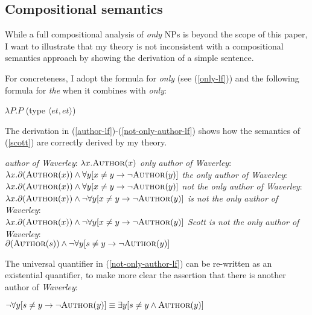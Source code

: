 \subsection{Compositional semantics}
While a full compositional analysis of \textit{only} NPs is beyond the scope of this paper, I want to illustrate that my theory is not inconsistent with a compositional semantics approach by showing the derivation of a simple sentence.

For concreteness, I adopt the  formula for \textit{only} (see (\ref{only-lf})) and the following formula for \textit{the} when it combines with \textit{only}:

\begin{exe}
	\ex $\lambda P . P$ (type $\langle et, et \rangle$)
\end{exe}

The derivation in (\ref{author-lf})-(\ref{not-only-author-lf}) shows how the semantics of (\ref{scott}) are correctly derived by my theory.

\begin{exe}
	\ex \label{author-lf} \textit{author of Waverley}: $\lambda x . \textsc{Author}(x)$
	\ex \textit{only author of Waverley}: $\lambda x . \partial(\textsc{Author}(x)) \land \forall y [ x \ne y \to \neg \textsc{Author}(y) ]$
	\ex \textit{the only author of Waverley}: $\lambda x . \partial(\textsc{Author}(x)) \land \forall y [ x \ne y \to \neg \textsc{Author}(y) ]$
	\ex \textit{not the only author of Waverley}: \\ $\lambda x . \partial(\textsc{Author}(x)) \land \neg  \forall y [ x \ne y \to \neg \textsc{Author}(y) ]$
	\ex \textit{is not the only author of Waverley}: \\ $\lambda x . \partial(\textsc{Author}(x)) \land \neg  \forall y [ x \ne y \to \neg \textsc{Author}(y) ]$
	\ex \label{not-only-author-lf} \textit{Scott is not the only author of Waverley}: \\ $\partial(\textsc{Author}(s)) \land \neg \forall y [ s \ne y \to \neg \textsc{Author}(y) ]$
\end{exe}

The universal quantifier in (\ref{not-only-author-lf}) can be re-written as an existential quantifier, to make more clear the assertion that there is another author of \textit{Waverley}:

\begin{exe}
	\ex $\neg \forall y [ s \ne y \to \neg \textsc{Author}(y) ] \equiv \exists y [ s \ne y \land \textsc{Author}(y) ]$
\end{exe}